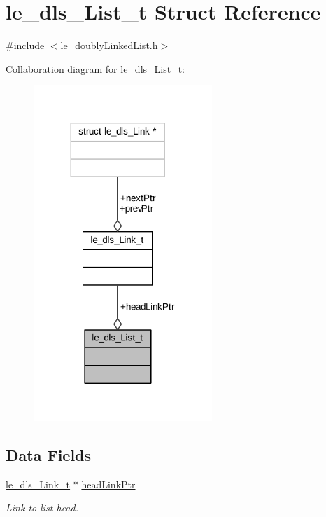 \hypertarget{structle__dls___list__t}{}\section{le\+\_\+dls\+\_\+\+List\+\_\+t Struct Reference}
\label{structle__dls___list__t}


{\ttfamily \#include $<$le\+\_\+doubly\+Linked\+List.\+h$>$}



Collaboration diagram for le\+\_\+dls\+\_\+\+List\+\_\+t\+:
\nopagebreak
\begin{figure}[H]
\begin{center}
\leavevmode
\includegraphics[width=191pt]{structle__dls___list__t__coll__graph}
\end{center}
\end{figure}
\subsection*{Data Fields}
\begin{DoxyCompactItemize}
\item 
\hyperlink{structle__dls___link__t}{le\+\_\+dls\+\_\+\+Link\+\_\+t} $\ast$ \hyperlink{structle__dls___list__t_a830f3082336d0b79e10e6206e2428dda}{head\+Link\+Ptr}
\begin{DoxyCompactList}\small\item\em Link to list head. \end{DoxyCompactList}\end{DoxyCompactItemize}


